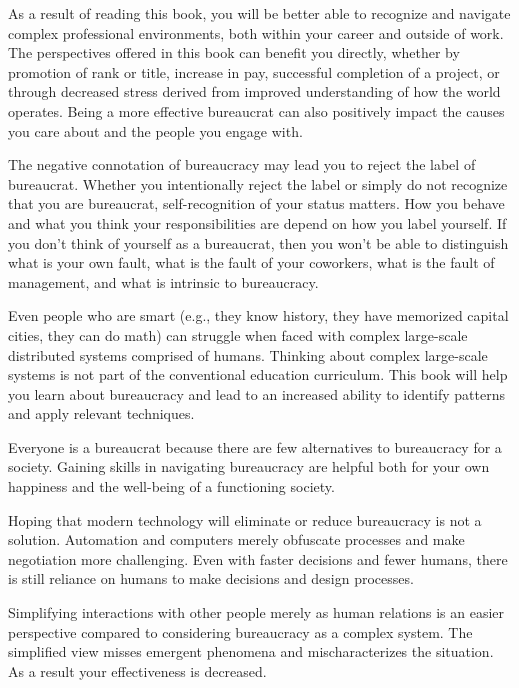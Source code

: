 As a result of reading this book, you will be better able to recognize and navigate complex professional environments, both within your career and outside of work. The perspectives offered in this book can benefit you directly, whether by promotion of rank or title, increase in pay, successful completion of a project, or through decreased stress derived from improved understanding of how the world operates. Being a more effective bureaucrat can also positively impact the causes you care about and the people you engage with.

The negative connotation of bureaucracy may lead you to reject the label of bureaucrat. Whether you intentionally reject the label or simply do not recognize that you are bureaucrat, self-recognition of your status matters. How you behave and what you think your responsibilities are depend on how you label yourself.
If you don't think of yourself as a bureaucrat, then you won't be able to distinguish what is your own fault, what is the fault of your coworkers, what is the fault of management, and what is intrinsic to bureaucracy. 


Even people who are smart (e.g., they know history, they have memorized capital cities, they can do math) can struggle when faced with complex large-scale distributed systems comprised of humans. Thinking about complex large-scale systems is not part of the conventional education curriculum. This book will help you learn about bureaucracy and lead to an increased ability to identify patterns and apply relevant techniques.

Everyone is a bureaucrat because there are few alternatives to bureaucracy for a society. Gaining skills in navigating bureaucracy are helpful both for your own happiness and the well-being of a functioning society. 

Hoping that modern technology will eliminate or reduce bureaucracy is not a solution. Automation and computers merely obfuscate processes and make negotiation more challenging. Even with faster decisions and fewer humans, there is still reliance on humans to make decisions and design processes.

Simplifying interactions with other people merely as human relations is an easier perspective compared to considering bureaucracy as a complex system.
The simplified view misses emergent phenomena and mischaracterizes the situation. As a result your effectiveness is decreased.



